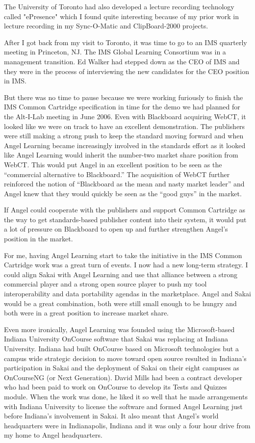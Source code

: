 \documentclass[12pt]{book}
\begin{document}
The University of Toronto had also developed a
lecture recording technology called "ePresence" which
I found quite interesting because of my prior
work in lecture recording in my Sync-O-Matic
and ClipBoard-2000 projects.

After I got back from my visit to Toronto, it was
time to go to an IMS quarterly meeting in Princeton,
NJ.  The IMS Global Learning Consortium was in a
management transition.   Ed Walker had
stepped down as the CEO of IMS and they were in the
process of interviewing the new candidates for the
CEO position in IMS.

But there was no time to pause because we were working
furiously to finish the IMS Common Cartridge
specification in time for the demo we had planned
for the Alt-I-Lab meeting in June 2006.  Even with
Blackboard acquiring WebCT, it looked like we were on
track to have an excellent demonstration.  The publishers
were still making a strong push to keep the standard
moving forward and when Angel Learning became increasingly
involved in the standards effort as it looked like
Angel Learning would inherit the number-two
market share position from WebCT.
This would put Angel in an excellent position to be seen
as the ``commercial alternative to Blackboard.''  The
acquisition of WebCT further reinforced the notion of
``Blackboard as the mean and nasty market leader'' and
Angel knew that they would quickly be seen as the
``good guys'' in the market.

If Angel could cooperate with the publishers and
support Common Cartridge as the way to get
standards-based publisher content into
their system, it would put a lot of pressure on
Blackboard to open up and further strengthen Angel's
position in the market.

\begin{sloppypar}
For me, having Angel Learning start to take the initiative
in the IMS Common Cartridge work was a great turn of events.
I now had a new long-term strategy.
I could align Sakai with Angel Learning
and use that alliance between a strong commercial player
and a strong open source player to push my
tool interoperability and data portability agendas
in the marketplace.
Angel and Sakai would be a great combination, both were
still small enough to be hungry and both were in a great
position to increase market share.
\end{sloppypar}

Even more ironically, Angel Learning was founded
using the Microsoft-based Indiana University
OnCourse software that Sakai was replacing
at Indiana University.   Indiana
had built OnCourse based on Microsoft technologies
but a campus wide strategic decision to move toward
open source resulted in Indiana's participation in
Sakai and the deployment of Sakai on their eight
campuses as OnCourseNG (or Next Generation).
David Mills had been a contract developer who had
been paid to work on OnCourse to develop its Tests
and Quizzes module.  When the work was done, he liked
it so well that he made arrangements with Indiana
University to license the software and formed
Angel Learning just before Indiana's involvement
in Sakai.  It also meant that Angel's world
headquarters were in Indianapolis, Indiana and it
was only a four hour drive from my home to Angel
headquarters.
\end{document}
